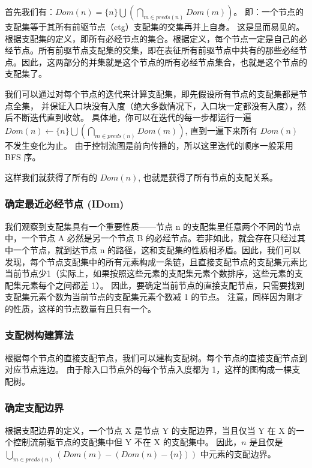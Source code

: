 首先我们有：$\mathit{Dom}(n) = \{n\} \bigcup \left(\bigcap_{m\in \mathit{preds}(n)} \mathit{Dom}(m)\right)$。
即：一个节点的支配集等于其所有前驱节点（ctg）支配集的交集再并上自身。
这是显而易见的。根据支配集的定义，即所有必经节点的集合。根据定义，每个节点一定是自己的必经节点。所有前驱节点支配集的交集，即在表征所有前驱节点中共有的那些必经节点。因此，这两部分的并集就是这个节点的所有必经节点集合，也就是这个节点的支配集了。

我们可以通过对每个节点的迭代来计算支配集，即先假设所有节点的支配集都是节点全集，
并保证入口块没有入度（绝大多数情况下，入口块一定都没有入度），然后不断迭代直到收敛。
具体地，你可以在迭代的每一步都运行一遍 $\mathit{Dom}(n) \leftarrow \{n\} \bigcup
\left(\bigcap_{m\in \mathit{preds}(n)} \mathit{Dom}(m)\right)$,
直到一遍下来所有 $\mathit{Dom}(n)$ 不发生变化为止。
由于控制流图是前向传播的，所以这里迭代的顺序一般采用 BFS 序。

这样我们就获得了所有的 $\mathit{Dom}(n)$, 也就是获得了所有节点的支配关系。

\subsubsection{确定最近必经节点 (IDom)}

我们观察到支配集具有一个重要性质——节点 n 的支配集里任意两个不同的节点中，一个节点 A 必然是另一个节点 B 的必经节点。若非如此，就会存在只经过其中一个节点，就到达节点 n 的路径，这和支配集的性质相矛盾。因此，我们可以发现，每个节点支配集中的所有元素构成一条链，且直接支配节点的支配集元素比当前节点少1（实际上，如果按照这些元素的支配集元素个数排序，这些元素的支配集元素每个之间都差 1）。
因此，要确定当前节点的直接支配节点，只需要找到支配集元素个数为当前节点的支配集元素个数减 1 的节点。
注意，同样因为刚才的性质，这样的节点数量有且只有一个。

\subsubsection{支配树构建算法}

根据每个节点的直接支配节点，我们可以建构支配树。每个节点的直接支配节点到对应节点连边。
由于除入口节点外的每个节点入度都为 1，这样的图构成一棵支配树。

\subsubsection{确定支配边界}

根据支配边界的定义，一个节点 X 是节点 Y 的支配边界，当且仅当 Y 在 X 的一个控制流前驱节点的支配集中但 Y 不在 X 的支配集中。
因此，$n$ 是且仅是 $\bigcup_{m\in\mathit{preds}(n)}\left(\mathit{Dom}(m)-(\mathit{Dom}(n)-\{n\})\right)$
中元素的支配边界。

